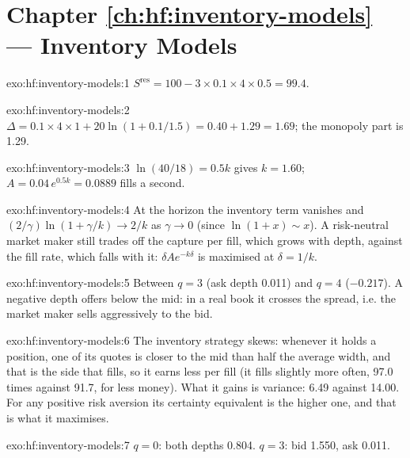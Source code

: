 \section*{Chapter \ref{ch:hf:inventory-models} --- Inventory Models}

\begin{solution}{exo:hf:inventory-models:1}
$S^{\mathrm{res}}=100-3\times0.1\times4\times0.5=99.4$.
\end{solution}

\begin{solution}{exo:hf:inventory-models:2}
$\Delta=0.1\times4\times1+20\ln(1+0.1/1.5)=0.40+1.29=1.69$; the monopoly part is 1.29.
\end{solution}

\begin{solution}{exo:hf:inventory-models:3}
$\ln(40/18)=0.5k$ gives $k=1.60$; $A=0.04\,e^{0.5k}=0.0889$ fills a second.
\end{solution}

\begin{solution}{exo:hf:inventory-models:4}
At the horizon the inventory term vanishes and $(2/\gamma)\ln(1+\gamma/k)\to2/k$ as $\gamma\to0$ (since $\ln(1+x)\sim x$). A risk-neutral market maker
still trades off the capture per fill, which grows with depth, against the fill rate, which falls with it: $\delta Ae^{-k\delta}$ is maximised at
$\delta=1/k$.
\end{solution}

\begin{solution}{exo:hf:inventory-models:5}
Between $q=3$ (ask depth 0.011) and $q=4$ ($-0.217$). A negative depth offers below the mid: in a real book it crosses the spread, i.e. the market
maker sells aggressively to the bid.
\end{solution}

\begin{solution}{exo:hf:inventory-models:6}
The inventory strategy skews: whenever it holds a position, one of its quotes is closer to the mid than half the average width, and that is the
side that fills, so it earns less per fill (it fills slightly more often, 97.0 times against 91.7, for less money). What it gains is variance:
6.49 against 14.00. For any positive risk aversion its certainty equivalent is the higher one, and that is what it maximises.
\end{solution}

\begin{solution}{exo:hf:inventory-models:7}
$q=0$: both depths 0.804. $q=3$: bid 1.550, ask 0.011.
\end{solution}

